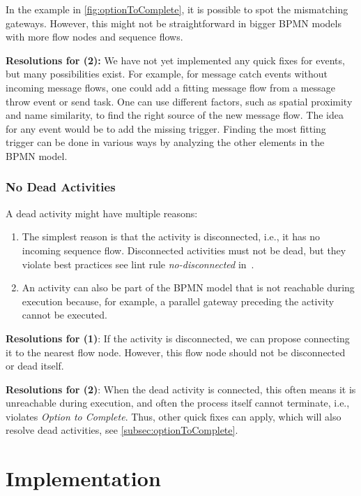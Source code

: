 \documentclass[runningheads]{llncs}
\begin{document}
In the example in \autoref{fig:optionToComplete}, it is possible to spot the mismatching gateways.
However, this might not be straightforward in bigger BPMN models with more flow nodes and sequence flows.

\textbf{Resolutions for (2):} We have not yet implemented any quick fixes for events, but many possibilities exist.
For example, for message catch events without incoming message flows, one could add a fitting message flow from a message throw event or send task.
One can use different factors, such as spatial proximity and name similarity, to find the right source of the new message flow.
The idea for any event would be to add the missing trigger.
Finding the most fitting trigger can be done in various ways by analyzing the other elements in the BPMN model.


\subsubsection{No Dead Activities}
A dead activity might have multiple reasons:

\begin{enumerate}
	\item The simplest reason is that the activity is disconnected, i.e., it has no incoming sequence flow.
	Disconnected activities must not be dead, but they violate best practices see lint rule \textit{no-disconnected} in~\cite{camundaservicesgmbhBpmnlint2024}.
	\item An activity can also be part of the BPMN model that is not reachable during execution because, for example, a parallel gateway preceding the activity cannot be executed.
\end{enumerate}

\textbf{Resolutions for (1)}: If the activity is disconnected, we can propose connecting it to the nearest flow node.
However, this flow node should not be disconnected or dead itself.

\textbf{Resolutions for (2)}: When the dead activity is connected, this often means it is unreachable during execution, and often the process itself cannot terminate, i.e., violates \textit{Option to Complete}.
Thus, other quick fixes can apply, which will also resolve dead activities, see \autoref{subsec:optionToComplete}.

\section{Implementation}
\end{document}
